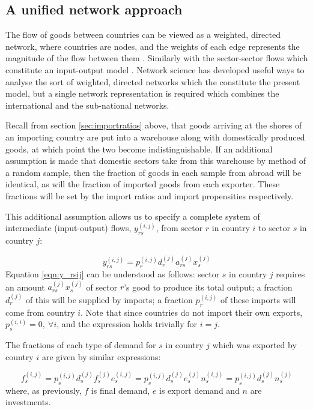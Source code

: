 \documentclass[a4paper]{article}
\begin{document}
\subsection*{A unified network approach}
The flow of goods between countries can be viewed as a weighted, directed network, where countries are nodes, and the weights of each edge represents the magnitude of the flow between them \parencite{Nystuen1961,Serrano2003,Bhattacharya2008,Baskaran2011}.
Similarly with the sector-sector flows which constitute an input-output model \parencite{Blochl2011}.
Network science has developed useful ways to analyse the sort of weighted, directed networks which the constitute the present model, but a single network representation is required which combines the international and the sub-national networks.

Recall from section \ref{sec:importratios} above, that goods arriving at the shores of an importing country are put into a warehouse along with domestically produced goods, at which point the two become indistinguishable.
If an additional assumption is made that domestic sectors take from this warehouse by method of a random sample, then the fraction of goods in each sample from abroad will be identical, as will the fraction of imported goods from each exporter.
These fractions will be set by the import ratios and import propensities respectively.

This additional assumption allows us to specify a complete system of intermediate (input-output) flows, $y_{rs}^{(i,j)}$, from sector $r$ in country $i$ to sector $s$ in country $j$:

\begin{equation}\label{eqn:y_rsij}
y_{rs}^{(i,j)} = p_{r}^{(i,j)} d_{r}^{(j)} a_{rs}^{(j)} x_{s}^{(j)}
\end{equation}
Equation \eqref{eqn:y_rsij} can be understood as follows:
sector $s$ in country $j$ requires an amount $a_{rs}^{(j)} x_{s}^{(j)}$ of sector $r$'s good to produce its total output;
a fraction $d_{r}^{(j)}$ of this will be supplied by imports;
a fraction $p_{r}^{(i,j)}$ of these imports will come from country $i$. Note that since countries do not import their own exports, $p_s^{(i,i)}=0,\ \forall i$, and the expression holds trivially for $i=j$.

The fractions of each type of demand for $s$ in country $j$ which was exported by country $i$ are given by similar expressions:

\begin{subequations}
\begin{equation}\label{eqn:y_rsij}
f_{s}^{(i,j)} = p_{s}^{(i,j)} d_{s}^{(j)} f_{s}^{(j)}
\end{equation}
\begin{equation}\label{eqn:y_rsij}
e_{s}^{(i,j)} = p_{s}^{(i,j)} d_{s}^{(j)} e_{s}^{(j)}
\end{equation}
\begin{equation}\label{eqn:y_rsij}
n_{s}^{(i,j)} = p_{s}^{(i,j)} d_{s}^{(j)} n_{s}^{(j)}
\end{equation}
\end{subequations}
where, as previously, $f$ is final demand, $e$ is export demand and $n$ are investments.
\end{document}
